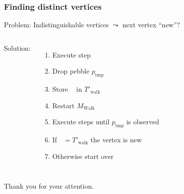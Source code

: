 \documentclass{beamer}
\DeclareMathOperator{\Twalk}{T_{\text{walk}}}
\begin{document}
\begin{frame}
  \frametitle{Finding distinct vertices}
  Problem: Indistinguishable vertices $\leadsto$ next vertex \enquote{new}?
  \begin{columns}
    Solution:
    \begin{enumerate}
      \item Execute step
      \item Drop pebble $p_{\text{tmp}}$
      \item Store $\Twalk$ in $T'_{\text{walk}}$
      \item Restart $M_{\text{Walk}}$
      \item Execute steps until $p_{\text{tmp}}$ is observed
      \item If $\Twalk = T'_{\text{walk}}$ the vertex is new
      \item Otherwise start over
    \end{enumerate}
    
  \end{columns}
\end{frame}

\begin{frame}
  \begin{center}
    \Huge Thank you for your attention.
  \end{center}
\end{frame}
\end{document}
